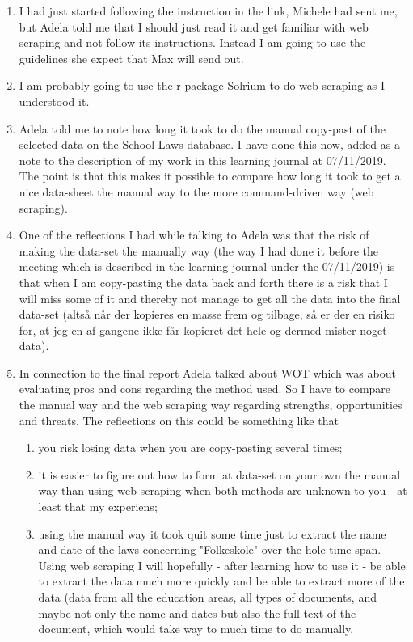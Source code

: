 \documentclass{article}
\begin{document}
\begin{enumerate}
    \item I had just started following the instruction in the link, Michele had sent me, but Adela told me that I should just read it and get familiar with web scraping and not follow its instructions. Instead I am going to use the guidelines she expect that Max will send out.
    \item I am probably going to use the r-package Solrium to do web scraping as I understood it. 
    \item Adela told me to note how long it took to do the manual copy-past of the selected data on the School Laws database. I have done this now, added as a note to the description of my work in this learning journal at 07/11/2019. The point is that this makes it possible to compare how long it took to get a nice data-sheet the manual way to the more command-driven way (web scraping). 
    \item One of the reflections I had while talking to Adela was that the risk of making the data-set the manually way (the way I had done it before the meeting which is described in the learning journal under the 07/11/2019) is that when I am copy-pasting the data back and forth there is a risk that I will miss some of it and thereby not manage to get all the data into the final data-set (altså når der kopieres en masse frem og tilbage, så er der en risiko for, at jeg en af gangene ikke får kopieret det hele og dermed mister noget data).
    \item In connection to the final report Adela talked about WOT which was about evaluating pros and cons regarding the method used. So I have to compare the manual way and the web scraping way regarding strengths, opportunities and threats. The reflections on this could be something like that
    \begin{enumerate}
        \item you risk losing data when you are copy-pasting several times;
        \item it is easier to figure out how to form at data-set on your own the manual way than using web scraping when both methods are unknown to you - at least that my experiens;
        \item using the manual way it took quit some time just to extract the name and date of the laws concerning "Folkeskole" over the hole time span. Using web scraping I will hopefully - after learning how to use it - be able to extract the data much more quickly and be able to extract more of the data (data from all the education areas, all types of documents, and maybe not only the name and dates but also the full text of the document, which would take way to much time to do manually.

\end{enumerate}
\end{enumerate}
\end{document}
